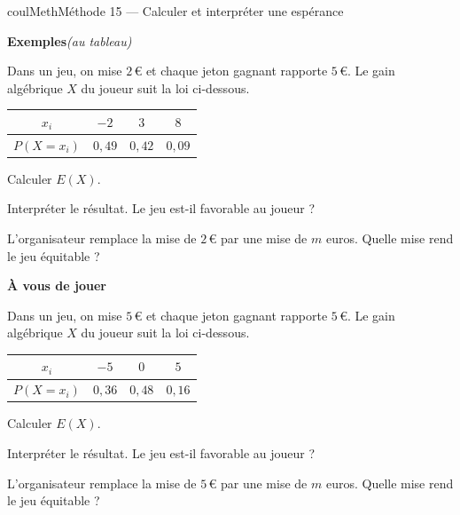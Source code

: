 \documentclass[11pt,a4paper]{article}
\makeatletter
\newcounter{lycee@signet}
\newcommand{\signet}[3][]{\stepcounter{lycee@signet}%
  \edef\lycee@dest{\if\relax\detokenize{#1}\relax
    signet.\arabic{lycee@signet}\else#1\fi}%
  \hypertarget{\lycee@dest}{}\bookmark[level=#2,dest=\lycee@dest]{#3}}
\newcounter{methode}
\newenvironment{methodebox}[1][Méthode]{\stepcounter{methode}%
  \begin{boitecours}[phantom={\signet[methode-\arabic{methode}]{2}{#1}}]{coulMeth}{#1}}%
  {\end{boitecours}}
\newcommand{\etape}[1]{\par\smallskip\textbf{\color{coulMeth}#1}\par\nobreak\smallskip}
\newcommand{\autableau}{\hfill{\footnotesize\itshape\color{black!45}(au tableau)}}
\newcommand{\etapeexemples}{%
    \par\smallskip\textbf{\color{coulMeth}Exemples}\autableau\par\nobreak\smallskip}
\makeatother
\begin{document}
\begin{methodebox}[Méthode 15 --- Calculer et interpréter une espérance]
\etapeexemples
Dans un jeu, on mise $2$\,€ et chaque jeton gagnant rapporte $5$\,€. Le gain algébrique
$X$ du joueur suit la loi ci-dessous.
\begin{center}
\renewcommand{\arraystretch}{1.4}
\begin{tabular}{|c|c|c|c|}
\hline
$x_{i}$ & $-2$ & $3$ & $8$\\\hline
$P(X=x_{i})$ & $0{,}49$ & $0{,}42$ & $0{,}09$\\\hline
\end{tabular}
\end{center}
\begin{questions}[label=\alph*)]
  \item Calculer $E(X)$.
  \item Interpréter le résultat. Le jeu est-il favorable au joueur ?
  \item L'organisateur remplace la mise de $2$\,€ par une mise de $m$ euros. Quelle mise
    rend le jeu équitable ?
\end{questions}

\etape{À vous de jouer}
Dans un jeu, on mise $5$\,€ et chaque jeton gagnant rapporte $5$\,€. Le gain algébrique
$X$ du joueur suit la loi ci-dessous.
\begin{center}
\renewcommand{\arraystretch}{1.4}
\begin{tabular}{|c|c|c|c|}
\hline
$x_{i}$ & $-5$ & $0$ & $5$\\\hline
$P(X=x_{i})$ & $0{,}36$ & $0{,}48$ & $0{,}16$\\\hline
\end{tabular}
\end{center}
\begin{questions}[label=\alph*)]
  \item Calculer $E(X)$.
  \item Interpréter le résultat. Le jeu est-il favorable au joueur ?
  \item L'organisateur remplace la mise de $5$\,€ par une mise de $m$ euros. Quelle mise
    rend le jeu équitable ?
\end{questions}

\end{methodebox}
\end{document}
